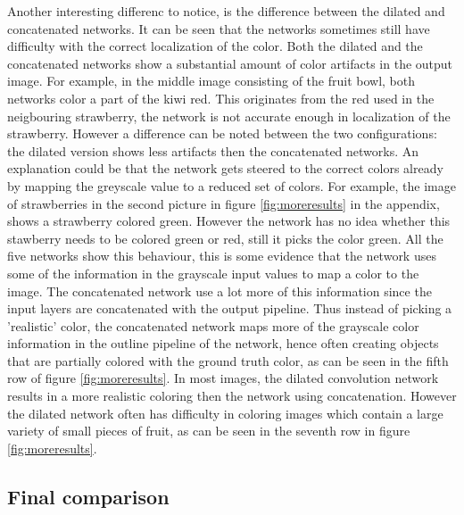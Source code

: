 Another interesting differenc to notice, is the difference between the dilated and concatenated networks. It can be seen that the networks sometimes still have difficulty with the correct localization of the color. Both the dilated and the concatenated networks show a substantial amount of color artifacts in the output image. For example, in the middle image consisting of the fruit bowl, both networks color a part of the kiwi red. This originates from the red used in the neigbouring strawberry, the network is not accurate enough in localization of the strawberry. However a difference can be noted between the two configurations: the dilated version shows less artifacts then the concatenated networks. An explanation could be that the network gets steered to the correct colors already by mapping the greyscale value to a reduced set of colors. For example, the image of strawberries in the second picture in figure \ref{fig:moreresults} in the appendix, shows a strawberry colored green. However the network has no idea whether this stawberry needs to be colored green or red, still it picks the color green. All the five networks show this behaviour, this is some evidence that the network uses some of the information in the grayscale input values to map a color to the image. The concatenated network use a lot more of this information since the input layers are concatenated with the output pipeline. Thus instead of picking a 'realistic' color, the concatenated network maps more of the grayscale color information in the outline pipeline of the network, hence often creating objects that are partially colored with the ground truth color, as can be seen in the fifth row of figure \ref{fig:moreresults}. In most images, the dilated convolution network results in a more realistic coloring then the network using concatenation. However the dilated network often has difficulty in coloring images which contain a large variety of small pieces of fruit, as can be seen in the seventh row in figure \ref{fig:moreresults}.
\subsection{Final comparison}








